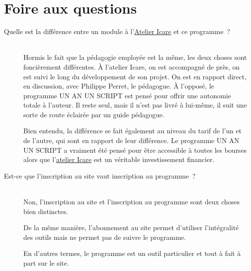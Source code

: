 % 
% 
% 
% 
% 
% 
% 
% 

\section{Foire aux questions}\hypertarget{faq}{}\label{faq}

\begin{description}
\item[Quelle est la différence entre un module à l'\href{http://www.atelier-icare.net}{Atelier Icare} et ce programme~{}?] \hfill \\
 Hormis le fait que la pédagogie employée est la même, les deux choses sont foncièrement différentes. À l'atelier Icare, on est accompagné de près, on est suivi le long du développement de son projet. On est en rapport direct, en discussion, avec Philippe Perret, le pédagogue. À l'opposé, le programme UN AN UN SCRIPT est pensé pour offrir une autonomie totale à l'auteur. Il reste seul, mais il n'est pas livré à lui-même, il suit une sorte de route éclairée par un guide pédagogue.



Bien entendu, la différence se fait également au niveau du tarif de l'un et de l'autre, qui sont en rapport de leur différence. Le programme UN AN UN SCRIPT a vraiment été pensé pour être accessible à toutes les bourses alors que l'\href{http://www.atelier-icare.net}{atelier Icare} est un véritable investissement financier.



\item[Est-ce que l'inscription au site vaut inscription au programme~{}?] \hfill \\
 Non, l'inscription au site \boa{} et l'inscription au programme \unan{} sont deux choses bien distinctes.



De la même manière, l'abonnement au site permet d'utiliser l'intégralité des outils mais ne permet pas de suivre le programme.



En d'autres termes, le programme \unan{} est un outil particulier et tout à fait à part sur le site.




\end{description}
